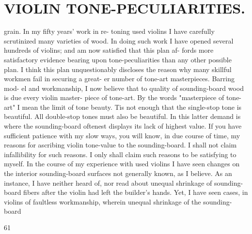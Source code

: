 \documentclass{article}
\begin{document}
\section*{VIOLIN TONE-PECULIARITIES.}
grain. In my fifty years' work in re- toning used violins I have carefully scrutinized many varieties of wood. In doing such work I have opened several hundreds of violins; and am now satisfied that this plan af- fords more satisfactory evidence bearing upon tone-peculiarities than any other possible plan. I think this plan unquestionably discloses the reason why many skillful workmen fail in securing a great- er number of tone-art masterpieces. Barring mod- el and workmanship, I now believe that to quality of sounding-board wood is due every violin master- piece of tone-art. By the words "masterpiece of tone-art" I mean the limit of tone beauty. Tis not enough that the single-stop tone is beautiful. All double-stop tones must also be beautiful. In this latter demand is where the sounding-board oftenest displays its lack of highest value. If you have sufficient patience with my slow ways, you will know, in due course of time, my reasons for ascribing violin tone-value to the sounding-board. I shall not claim infallibility for such reasons. I only shall claim such reasons to be satisfying to myself. In the course of my experience with used violins I have seen changes on the interior sounding-board surfaces not generally known, as I believe. As an instance, I have neither heard of, nor read about unequal shrinkage of sounding-board fibers after the violin had left the builder's hands. Yet, I have seen cases, in violins of faultless workmanship, wherein unequal shrinkage of the sounding-board

61
\end{document}
